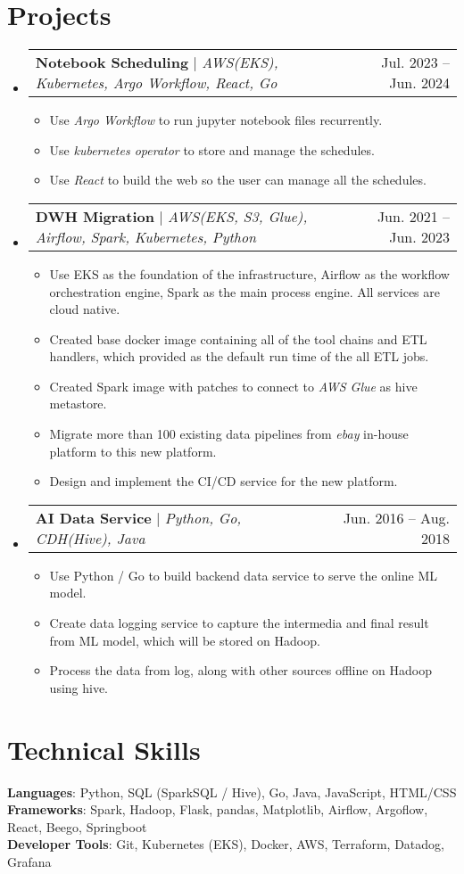\documentclass[a4paper,11pt]{article}
\makeatletter
\newcommand{\resumeItem}[1]{
  \item\small{
    {#1 \vspace{-2pt}}
  }
}
\newcommand{\resumeProjectHeading}[2]{
    \item
    \begin{tabular*}{0.97\textwidth}{l@{\extracolsep{\fill}}r}
      \small#1 & #2 \\
    \end{tabular*}\vspace{-7pt}
}
\newcommand{\resumeSubHeadingListStart}{\begin{itemize}[leftmargin=0.15in, label={}]}
\newcommand{\resumeSubHeadingListEnd}{\end{itemize}}
\newcommand{\resumeItemListStart}{\begin{itemize}}
\newcommand{\resumeItemListEnd}{\end{itemize}\vspace{-5pt}}
\makeatother
\begin{document}
\section{Projects}
    \resumeSubHeadingListStart
      \resumeProjectHeading
          {\textbf{Notebook Scheduling} $|$ \emph{AWS(EKS), Kubernetes, Argo Workflow, React, Go}}{Jul. 2023 -- Jun. 2024}
          \resumeItemListStart
            \resumeItem{Use \emph{Argo Workflow} to run jupyter notebook files recurrently.}
            \resumeItem{Use \emph{kubernetes operator} to store and manage the schedules.}
            \resumeItem{Use \emph{React} to build the web so the user can manage all the schedules.}
          \resumeItemListEnd
      \resumeProjectHeading
          {\textbf{DWH Migration} $|$ \emph{AWS(EKS, S3, Glue), Airflow, Spark, Kubernetes, Python}}{Jun. 2021 -- Jun. 2023}
          \resumeItemListStart
            \resumeItem{Use EKS as the foundation of the infrastructure, Airflow as the workflow orchestration engine, Spark as the main process engine. All services are cloud native.}
            \resumeItem{Created base docker image containing all of the tool chains and ETL handlers, which provided as the default run time of the all ETL jobs.}
            \resumeItem{Created Spark image with patches to connect to \emph{AWS Glue} as hive metastore.}
            \resumeItem{Migrate more than 100 existing data pipelines from \emph{ebay} in-house platform to this new platform.} 
            \resumeItem{Design and implement the CI/CD service for the new platform.}
          \resumeItemListEnd
      \resumeProjectHeading
          {\textbf{AI Data Service} $|$ \emph{Python, Go, CDH(Hive), Java}}{Jun. 2016 -- Aug. 2018}
          \resumeItemListStart
            \resumeItem{Use Python / Go to build backend data service to serve the online ML model.}
            \resumeItem{Create data logging service to capture the intermedia and final result from ML model, which will be stored on Hadoop.}
            \resumeItem{Process the data from log, along with other sources offline on Hadoop using hive.}
          \resumeItemListEnd
    \resumeSubHeadingListEnd


%
\section{Technical Skills}
 \begin{itemize}[leftmargin=0.15in, label={}]
    \small{\item{
     \textbf{Languages}{: Python, SQL (SparkSQL / Hive), Go, Java, JavaScript, HTML/CSS} \\
     \textbf{Frameworks}{: Spark, Hadoop, Flask, pandas, Matplotlib, Airflow, Argoflow, React, Beego, Springboot } \\
     \textbf{Developer Tools}{: Git, Kubernetes (EKS), Docker, AWS, Terraform, Datadog, Grafana} \\
    }}
 \end{itemize}


\end{document}
